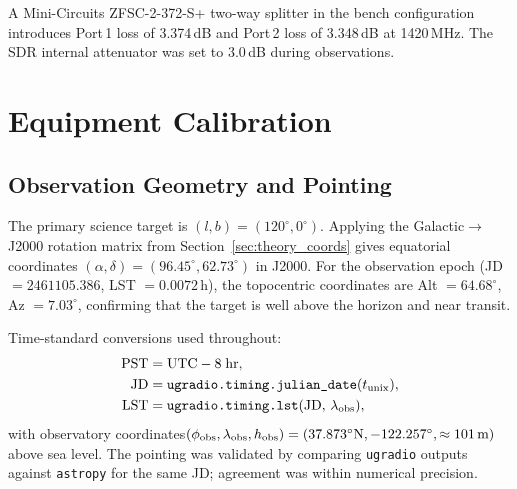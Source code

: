 \documentclass[10pt,preprint2]{aastex}
\begin{document}
A Mini-Circuits ZFSC-2-372-S+ two-way splitter in the bench configuration introduces
Port\,1 loss of 3.374\,dB and Port\,2 loss of 3.348\,dB at 1420\,MHz.
The SDR internal attenuator was set to 3.0\,dB during observations.

\section{Equipment Calibration}
\label{sec:equipment_cal}

\subsection{Observation Geometry and Pointing}
\label{sec:pointing}

The primary science target is $(l,b) = (120^\circ, 0^\circ)$.
Applying the Galactic$\to$J2000 rotation matrix
from Section~\ref{sec:theory_coords} gives equatorial coordinates
$(\alpha, \delta) = (96.45^\circ, 62.73^\circ)$ in J2000.
For the observation epoch (JD $= 2461105.386$, LST $= 0.0072$\,h),
the topocentric coordinates are Alt $= 64.68^\circ$, Az $= 7.03^\circ$,
confirming that the target is well above the horizon and near transit.

Time-standard conversions used throughout:
\begin{align}
  \mathrm{PST} &= \mathrm{UTC} - 8\;\mathrm{hr},\\
  \mathrm{JD}  &= \texttt{ugradio.timing.julian\_date}(t_{\rm unix}),\\
  \mathrm{LST} &= \texttt{ugradio.timing.lst}(\mathrm{JD},\,\lambda_{\rm obs}),
\end{align}
with observatory coordinates\newline $(\phi_{\rm obs}, \lambda_{\rm obs}, h_{\rm obs})
= (37.873^\circ\mathrm{N}, -122.257^\circ, \approx 101\,\mathrm{m})$ above sea level.
The pointing was validated by comparing \texttt{ugradio} outputs
against \texttt{astropy} for the same JD; agreement was within numerical precision.

\end{document}
